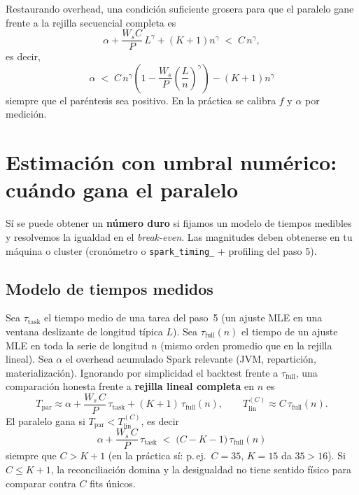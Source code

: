 \documentclass[11pt,a4paper]{article}
\begin{document}
Restaurando overhead, una condición suficiente grosera para que el paralelo
gane frente a la rejilla secuencial completa es
\begin{equation}
  \alpha + \frac{W_s C}{P}\, L^\gamma + (K+1) n^\gamma
  \;<\; C\, n^\gamma ,
\end{equation}
es decir,
\begin{equation}
  \boxed{
  \alpha \;<\; C\, n^\gamma \left(1 - \frac{W_s}{P}\left(\frac{L}{n}\right)^\gamma\right)
  - (K+1) n^\gamma
  }
\end{equation}
siempre que el paréntesis sea positivo. En la práctica se calibra $f$ y $\alpha$
por medición.

\section{Estimación con umbral numérico: cuándo gana el paralelo}
\label{sec:hard-threshold}

Sí se puede obtener un \textbf{número duro} si fijamos un modelo de tiempos
medibles y resolvemos la igualdad en el \emph{break-even}. Las magnitudes deben
obtenerse en tu máquina o cluster (cronómetro o \texttt{spark\_timing\_} +
profiling del paso 5).

\subsection{Modelo de tiempos medidos}

Sea $\tau_{\mathrm{task}}$ el tiempo medio de una tarea del paso~5 (un ajuste
MLE en una ventana deslizante de longitud típica $L$). Sea $\tau_{\mathrm{full}}(n)$
el tiempo de un ajuste MLE en toda la serie de longitud $n$ (mismo orden
promedio que en la rejilla lineal). Sea $\alpha$ el overhead acumulado Spark
relevante (JVM, repartición, materialización). Ignorando por simplicidad el
backtest frente a $\tau_{\mathrm{full}}$, una comparación honesta frente a
\textbf{rejilla lineal completa} en $n$ es
\begin{equation}
  \label{eq:Twall-grid}
  T_{\mathrm{par}} \approx
  \alpha + \frac{W_s\, C}{P}\,\tau_{\mathrm{task}}
  + (K+1)\,\tau_{\mathrm{full}}(n),
  \qquad
  T_{\mathrm{lin}}^{(C)} \approx C\,\tau_{\mathrm{full}}(n).
\end{equation}
El paralelo gana si $T_{\mathrm{par}} < T_{\mathrm{lin}}^{(C)}$, es decir
\begin{equation}
  \label{eq:ineq-tau}
  \boxed{
  \alpha + \frac{W_s\, C}{P}\,\tau_{\mathrm{task}}
  \;<\; \bigl(C - K - 1\bigr)\,\tau_{\mathrm{full}}(n)
  }
\end{equation}
siempre que $C > K + 1$ (en la práctica sí: p.\,ej.\ $C=35$, $K=15$ da $35>16$).
Si $C \le K+1$, la reconciliación domina y la desigualdad no tiene sentido físico
para comparar contra $C$ fits únicos.
\end{document}

